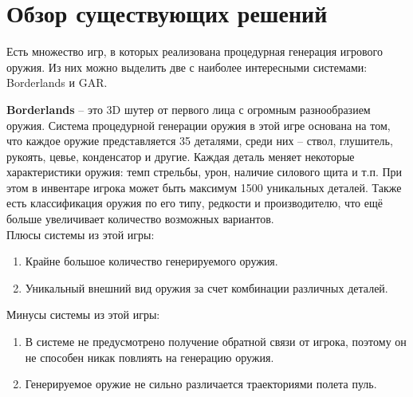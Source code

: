 ﻿%
\section{Обзор существующих решений}\label{sec:existingSolutions}

Есть множество игр, в которых реализована процедурная генерация игрового оружия. Из них можно выделить две с наиболее интересными системами: Borderlands\cite{s14} и GAR\cite{s15}.

\vspace{1mm}

\textbf{Borderlands} -- это 3D шутер от первого лица с огромным разнообразием оружия. Система процедурной генерации оружия в этой игре основана на том, что каждое оружие представляется 35 деталями, среди них -- ствол, глушитель, рукоять, цевье, конденсатор и другие. Каждая деталь меняет некоторые характеристики оружия: темп стрельбы, урон, наличие силового щита и т.п. При этом в инвентаре игрока может быть максимум 1500 уникальных деталей. Также есть классификация оружия по его типу, редкости и производителю, что ещё больше увеличивает количество возможных вариантов. 
%
\\Плюсы системы из этой игры:
\begin{enumerate}[--]
    \item Крайне большое количество генерируемого оружия.
    \item Уникальный внешний вид оружия за счет комбинации различных деталей.
\end{enumerate} 
%
Минусы системы из этой игры:
\begin{enumerate}[--]
    \item В системе не предусмотрено получение обратной связи от игрока, поэтому он не способен никак повлиять на генерацию оружия.
    \item Генерируемое оружие не сильно различается траекториями полета пуль.
\end{enumerate}

\vspace{1mm}


